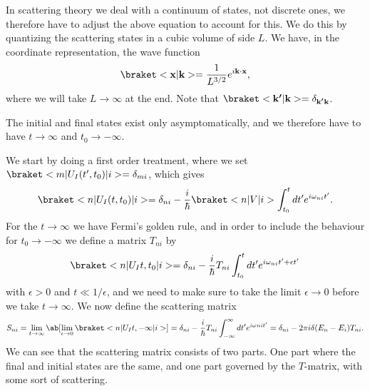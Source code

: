 In scattering theory we deal with a continuum of states, not discrete ones, we therefore have to adjust the above equation to account for this. We do this by quantizing the scattering states in a cubic volume of side $L$. We have, in the coordinate representation, the wave function
\begin{equation}
    \bk{\vec{x}}{\vec{k}} = \frac{1}{L^{3/2}} e^{i\vec{k}\cdot\vec{x}},
\end{equation}
where we will take $L\to\infty$ at the end. Note that $\bk{\vec{k'}}{\vec{k}} = \delta_{\vec{k'}\vec{k}}$.

The initial and final states exist only asymptomatically, and we therefore have to have $t\to\infty$ and $t_0 \to -\infty$.

We start by doing a first order treatment, where we set $\bkop{m}{U_I(t',t_0)}{i} = \delta_{mi}$, which gives
\begin{equation}
    \bkop{n}{U_I(t,t_0)}{i} = \delta_{ni} - \frac{i}{\hbar} \bkop{n}{V}{i} \int_{t_0}^{t} dt' e^{i\omega_{ni}t'}.
\end{equation}
For the $t\to\infty$ we have Fermi's golden rule, and in order to include the behaviour for $t_0 \to - \infty$ we define a matrix $T_{ni}$ by
\begin{equation}
    \bkop{n}{U_I{t,t_0}}{i} = \delta_{ni} - \frac{i}{\hbar} T_{ni} \int_{t_0}^{t} dt' e^{i\omega_{ni}t' + \epsilon t'}
\end{equation}
with $\epsilon > 0$ and $t \ll 1/\epsilon$, and we need to make sure to take the limit $\epsilon \to 0$ before we take $t \to \infty$. We now define the scattering matrix
\begin{equation}
    S_{ni} = \lim_{t\to \infty} \ab[\lim_{\epsilon\to 0} \bkop{n}{U_I{t,-\infty}}{i}] = \delta_{ni} - \frac{i}{\hbar} T_{ni} \int_{-\infty}^{\infty} dt' e^{i\omega{ni} t'} = \delta_{ni} - 2\pi i \delta(E_n - E_i) T_{ni}.
\end{equation}
We can see that the scattering matrix consists of two parts. One part where the final and initial states are the same, and one part governed by the $T$-matrix, with some sort of scattering.

